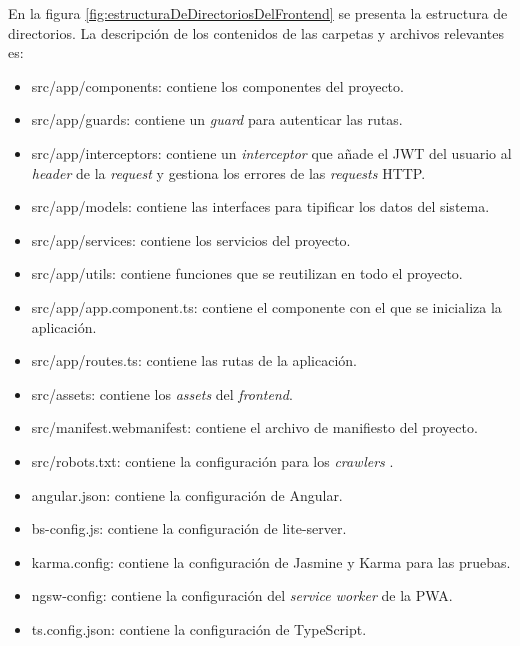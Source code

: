 En la figura \ref{fig:estructuraDeDirectoriosDelFrontend} se presenta la estructura de directorios. La descripción de los contenidos de las carpetas y archivos relevantes es:
\begin{itemize}
	\item src/app/components: contiene los componentes del proyecto.
	\item src/app/guards: contiene un \emph{guard} para autenticar las rutas.
	\item src/app/interceptors: contiene un \textit{interceptor} que añade el JWT del usuario al \textit{header} de la \emph{request} y gestiona los errores de las \emph{requests} HTTP.
	\item src/app/models: contiene las interfaces para tipificar los datos del sistema.
	\item src/app/services: contiene los servicios del proyecto.
	\item src/app/utils: contiene funciones que se reutilizan en todo el proyecto.
	\item src/app/app.component.ts: contiene el componente con el que se inicializa la aplicación.  
	\item src/app/routes.ts: contiene las rutas de la aplicación.
	\item src/assets: contiene los \emph{assets} del \emph{frontend}.
	\item src/manifest.webmanifest: contiene el archivo de manifiesto del proyecto.
	\item src/robots.txt: contiene la configuración para los \emph{crawlers} \citep{WEBSITE:CRAWLER}.
	\item angular.json: contiene la configuración de Angular.
	\item bs-config.js: contiene la configuración de lite-server. 
	\item karma.config: contiene la configuración de Jasmine y Karma \citep{WEBSITE:KARMA} para las pruebas.
	\item ngsw-config: contiene la configuración del \emph{service worker} de la PWA.
	\item ts.config.json: contiene la configuración de TypeScript.
\end{itemize}

